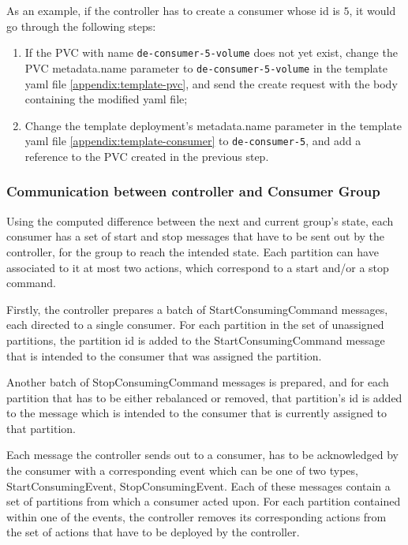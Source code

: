 As an example, if the controller has to create a consumer whose id is $5$, it
would go through the following steps: 
\begin{enumerate} 
    \item If the PVC with name \lstinline{de-consumer-5-volume} does not yet
        exist, change the PVC metadata.name parameter to
        \lstinline{de-consumer-5-volume} in the template yaml file
        \ref{appendix:template-pvc}, and send the create request with the body
        containing the modified yaml file;
    \item Change the template deployment's metadata.name parameter in the
        template yaml file \ref{appendix:template-consumer} to
        \lstinline{de-consumer-5}, and add a reference to the PVC created in the
        previous step.  
\end{enumerate}

\subsubsection{Communication between controller and Consumer Group}
\label{sub:controller_communication_cosumer}

Using the computed difference between the next and current group's state, each
consumer has a set of start and stop messages that have to be sent out by the
controller, for the group to reach the intended state. Each partition can have
associated to it at most two actions, which correspond to a start and/or a stop
command. 

Firstly, the controller prepares a batch of StartConsumingCommand messages, each
directed to a single consumer. For each partition in the set of unassigned
partitions, the partition id is added to the StartConsumingCommand message that
is intended to the consumer that was assigned the partition.

Another batch of StopConsumingCommand messages is prepared, and for each
partition that has to be either rebalanced or removed, that partition's id is
added to the message which is intended to the consumer that is currently
assigned to that partition. 

Each message the controller sends out to a consumer, has to be acknowledged by
the consumer with a corresponding event which can be one of two types,
StartConsumingEvent, StopConsumingEvent. Each of these messages contain a set of
partitions from which a consumer acted upon. For each partition contained within
one of the events, the controller removes its corresponding actions from the set
of actions that have to be deployed by the controller. 

